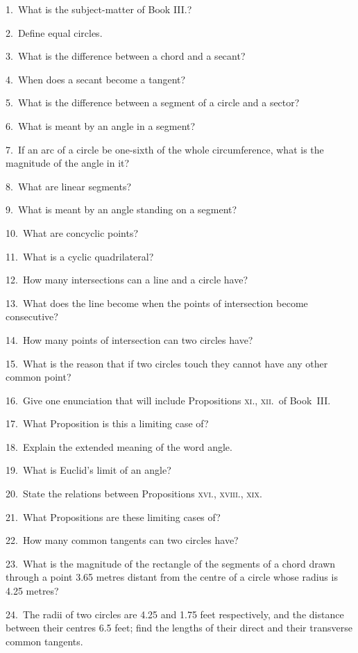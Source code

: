 \documentclass[oneside]{book}
\begin{document}
\begin{footnotesize}
1.~What is the subject-matter of Book III\@.?

2.~Define equal circles.

3.~What is the difference between a chord and a secant?

4.~When does a secant become a tangent?

5.~What is the difference between a segment of a circle and
a sector?

6.~What is meant by an angle in a segment?

7.~If an arc of a circle be one-sixth of the whole circumference,
what is the magnitude of the angle in it?

8.~What are linear segments?

9.~What is meant by an angle standing on a segment?

10.~What are concyclic points?

11.~What is a cyclic quadrilateral?

12.~How many intersections can a line and a circle have?

13.~What does the line become when the points of intersection
become consecutive?

14.~How many points of intersection can two circles have?

15.~What is the reason that if two circles touch they cannot
have any other common point?

16.~Give one enunciation that will include Propositions \textsc{xi.,
xii.}\ of Book~III\@.

17.~What Proposition is this a limiting case of?

18.~Explain the extended meaning of the word angle.

19.~What is Euclid's limit of an angle?

20.~State the relations between Propositions \textsc{xvi., xviii., xix.}

21.~What Propositions are these limiting cases of?

22.~How many common tangents can two circles have?

23.~What is the magnitude of the rectangle of the segments of
a chord drawn through a point 3.65 metres distant from the centre
of a circle whose radius is 4.25 metres?


24.~The radii of two circles are 4.25 and 1.75 feet respectively,
and the distance between their centres 6.5 feet; find the lengths
of their direct and their transverse common tangents.


\end{footnotesize}
\end{document}
